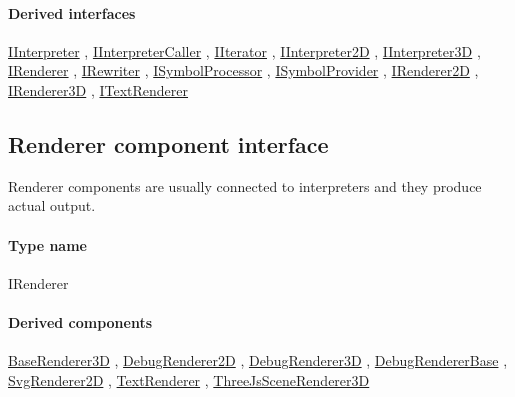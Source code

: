 	\paragraph{Derived interfaces}
		\hyperref[Malsys.Processing.Components.IInterpreter]{IInterpreter}%
, 		\hyperref[Malsys.Processing.Components.IInterpreterCaller]{IInterpreterCaller}%
, 		\hyperref[Malsys.Processing.Components.IIterator]{IIterator}%
, 		\hyperref[Malsys.Processing.Components.Interpreters.IInterpreter2D]{IInterpreter2D}%
, 		\hyperref[Malsys.Processing.Components.Interpreters.IInterpreter3D]{IInterpreter3D}%
, 		\hyperref[Malsys.Processing.Components.IRenderer]{IRenderer}%
, 		\hyperref[Malsys.Processing.Components.IRewriter]{IRewriter}%
, 		\hyperref[Malsys.Processing.Components.ISymbolProcessor]{ISymbolProcessor}%
, 		\hyperref[Malsys.Processing.Components.ISymbolProvider]{ISymbolProvider}%
, 		\hyperref[Malsys.Processing.Components.Renderers.IRenderer2D]{IRenderer2D}%
, 		\hyperref[Malsys.Processing.Components.Renderers.IRenderer3D]{IRenderer3D}%
, 		\hyperref[Malsys.Processing.Components.Renderers.ITextRenderer]{ITextRenderer}%
	

\subsection{Renderer component interface}
\label{Malsys.Processing.Components.IRenderer}
Renderer components are usually connected to interpreters and they produce actual output.\paragraph{Type name}
IRenderer	\paragraph{Derived components}
		\hyperref[Malsys.Processing.Components.Renderers.BaseRenderer3D]{BaseRenderer3D}%
, 		\hyperref[Malsys.Processing.Components.Renderers.DebugRenderer2D]{DebugRenderer2D}%
, 		\hyperref[Malsys.Processing.Components.Renderers.DebugRenderer3D]{DebugRenderer3D}%
, 		\hyperref[Malsys.Processing.Components.Renderers.DebugRendererBase]{DebugRendererBase}%
, 		\hyperref[Malsys.Processing.Components.Renderers.SvgRenderer2D]{SvgRenderer2D}%
, 		\hyperref[Malsys.Processing.Components.Renderers.TextRenderer]{TextRenderer}%
, 		\hyperref[Malsys.Processing.Components.Renderers.ThreeJsSceneRenderer3D]{ThreeJsSceneRenderer3D}%
